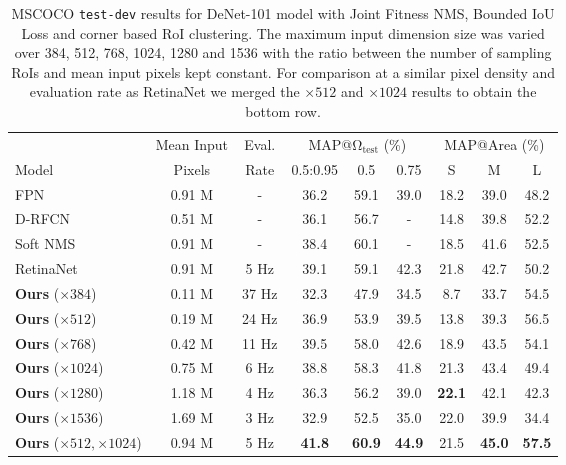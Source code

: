 \documentclass[10pt,twocolumn,letterpaper]{article}
\begin{document}
\begin{table*}[tb]
\begin{center}
\begin{tabular}{l|c|c|ccc|ccc}
 & Mean Input & Eval. & \multicolumn{3}{|c|}{MAP@$\bm{\mathrm{\Omega_{test}}}$ (\%)} & \multicolumn{3}{|c}{MAP@Area (\%)} \\
Model & Pixels & Rate & 0.5:0.95 & 0.5 & 0.75 & S & M & L\\
\hline
FPN\cite{fpn} & 0.91 M & - & 36.2 & 59.1 & 39.0 & 18.2 & 39.0 & 48.2\\
D-RFCN\cite{r-fcn} & 0.51 M & - & 36.1& 56.7 & - & 14.8 & 39.8 & 52.2\\
Soft NMS\cite{soft-nms} & 0.91 M & - & 38.4 & 60.1 & - & 18.5 & 41.6 & 52.5\\
RetinaNet\cite{retinanet} & 0.91 M & 5 Hz & 39.1 & 59.1& 42.3 & 21.8 & 42.7 & 50.2\\
\hline
\textbf{Ours} ($\times 384$) & 0.11 M & 37 Hz & 32.3 & 47.9 & 34.5 & 8.7 & 33.7 & 54.5 \\
\textbf{Ours} ($\times 512$) & 0.19 M & 24 Hz & 36.9 & 53.9 & 39.5 & 13.8 & 39.3 & 56.5 \\
\textbf{Ours} ($\times 768$) & 0.42 M & 11 Hz & 39.5 & 58.0 & 42.6 & 18.9 & 43.5 & 54.1 \\
\textbf{Ours} ($\times 1024$) & 0.75 M & 6 Hz & 38.8 & 58.3 & 41.8 & 21.3 & 43.4 & 49.4 \\
\textbf{Ours} ($\times 1280$) & 1.18 M & 4 Hz & 36.3 & 56.2 & 39.0 & \textbf{22.1} & 42.1 & 42.3 \\
\textbf{Ours} ($\times 1536$) & 1.69 M & 3 Hz & 32.9 & 52.5 & 35.0 & 22.0 & 39.9 & 34.4 \\
\hline
\textbf{Ours} ($\times 512,\times 1024$) & 0.94 M & 5 Hz & \textbf{41.8} & \textbf{60.9} & \textbf{44.9} & 21.5 & \textbf{45.0} & \textbf{57.5} \\
\end{tabular}
\end{center}
\caption{MSCOCO \texttt{test-dev} results for DeNet-101 model with Joint Fitness NMS, Bounded IoU Loss and corner based RoI clustering. The maximum input dimension size was varied over 384, 512, 768, 1024, 1280 and 1536 with the ratio between the number of sampling RoIs and mean input pixels kept constant. For comparison at a similar pixel density and evaluation rate as RetinaNet we merged the $\times 512$ and $\times 1024$ results to obtain the bottom row.}
\label{table:mscoco_input_scaling}
\end{table*}
\end{document}

